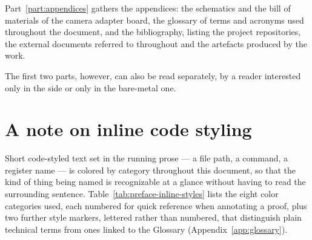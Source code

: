 Part~\ref{part:appendices} gathers the appendices: the schematics and the bill of materials of the camera adapter board, the glossary of terms and acronyms used throughout the document, and the bibliography, listing the project repositories, the external documents referred to throughout and the artefacts produced by the work.

The first two parts, however, can also be read separately, by a reader interested only in the  side or only in the bare-metal one.

\section{A note on inline code styling}

Short code-styled text set in the running prose --- a file path, a command, a register name --- is colored by category throughout this document, so that the kind of thing being named is recognizable at a glance without having to read the surrounding sentence. Table~\ref{tab:preface-inline-styles} lists the eight color categories used, each numbered for quick reference when annotating a proof, plus two further style markers, lettered rather than numbered, that distinguish plain technical terms from ones linked to the Glossary (Appendix~\ref{app:glossary}).

